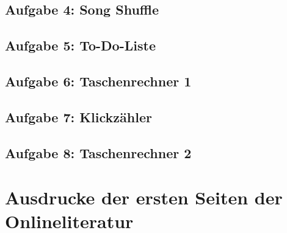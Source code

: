 \begin{appendices}
\subsection{Aufgabe 4: Song Shuffle}
\label{app:code4}






\subsection{Aufgabe 5: To-Do-Liste}
\label{app:code5}






\subsection{Aufgabe 6: Taschenrechner 1}
\label{app:code6}




\subsection{Aufgabe 7: Klickzähler}
\label{app:code7}




\subsection{Aufgabe 8: Taschenrechner 2}
\label{app:code8}




\section{Ausdrucke der ersten Seiten der Onlineliteratur}
\pagebreak


\end{appendices}